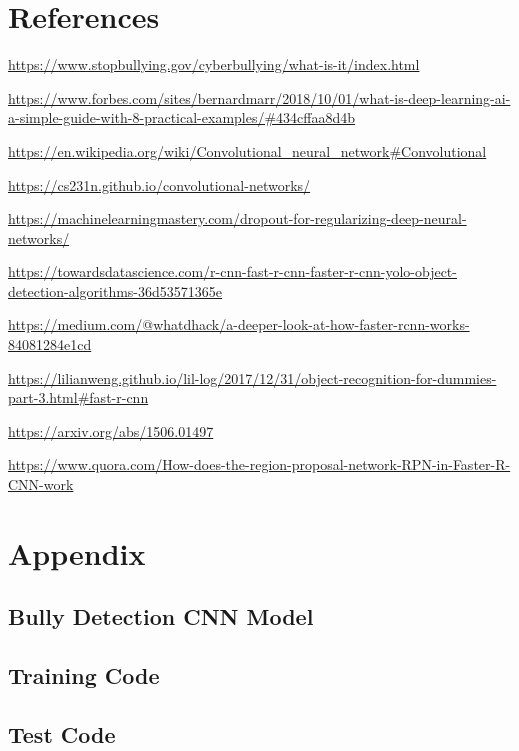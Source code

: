 \documentclass[12pt]{article}
\begin{document}
\section{References}
\begin{enumerate}[label={[\arabic*]}]
\item \url{https://www.stopbullying.gov/cyberbullying/what-is-it/index.html}
\item \url{https://www.forbes.com/sites/bernardmarr/2018/10/01/what-is-deep-learning-ai-a-simple-guide-with-8-practical-examples/#434cffaa8d4b}
\item \url{https://en.wikipedia.org/wiki/Convolutional_neural_network#Convolutional}
\item \url{https://cs231n.github.io/convolutional-networks/}
\item \url{https://machinelearningmastery.com/dropout-for-regularizing-deep-neural-networks/}
\item \url{https://towardsdatascience.com/r-cnn-fast-r-cnn-faster-r-cnn-yolo-object-detection-algorithms-36d53571365e}
\item \url{https://medium.com/@whatdhack/a-deeper-look-at-how-faster-rcnn-works-84081284e1cd}
\item \url{https://lilianweng.github.io/lil-log/2017/12/31/object-recognition-for-dummies-part-3.html#fast-r-cnn}
\item \url{https://arxiv.org/abs/1506.01497}
\item \url{https://www.quora.com/How-does-the-region-proposal-network-RPN-in-Faster-R-CNN-work}
\end{enumerate}
\newpage

\section{Appendix}
\subsection{Bully Detection CNN Model}

\subsection{Training Code}

\subsection{Test Code}

\end{document}
